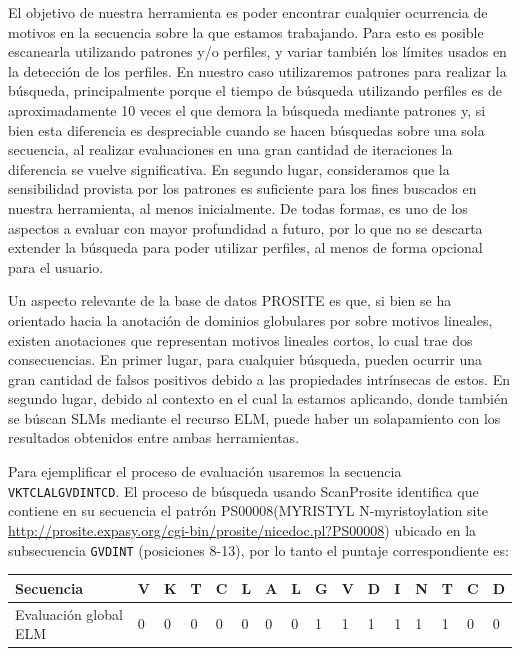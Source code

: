 El objetivo de nuestra herramienta es poder encontrar cualquier ocurrencia de motivos en la secuencia sobre la que estamos trabajando. 
Para esto es posible escanearla utilizando patrones y/o perfiles, y variar también los límites usados en la detección de los perfiles. 
En nuestro caso utilizaremos patrones para realizar la búsqueda, principalmente porque el tiempo de búsqueda utilizando perfiles es de aproximadamente 10 veces el que demora la búsqueda mediante patrones 
y, si bien esta diferencia es despreciable cuando se hacen búsquedas sobre una sola secuencia, al realizar evaluaciones en una gran cantidad de iteraciones la diferencia se vuelve significativa.
En segundo lugar, consideramos que la sensibilidad provista por los patrones es suficiente para los fines buscados en nuestra herramienta, al menos inicialmente.
De todas formas, es uno de los aspectos a evaluar con mayor profundidad a futuro, por lo que no se descarta extender la búsqueda para poder utilizar perfiles, al menos de forma opcional para el usuario. 

Un aspecto relevante de la base de datos PROSITE es que, si bien se ha orientado hacia la anotación de dominios globulares por sobre motivos lineales, existen anotaciones que representan motivos lineales cortos, 
lo cual trae dos consecuencias. En primer lugar, para cualquier búsqueda, pueden ocurrir una gran cantidad de falsos positivos debido a las propiedades intrínsecas de estos.
En segundo lugar, debido al contexto en el cual la estamos aplicando, donde también se búscan SLMs mediante el recurso ELM, puede haber un solapamiento con los resultados obtenidos entre ambas herramientas.

Para ejemplificar el proceso de evaluación usaremos la secuencia \texttt{VKTCLALGVDINTCD}. El proceso de búsqueda usando ScanProsite identifica que contiene en su secuencia el patrón PS00008(MYRISTYL N-myristoylation site 
\url{http://prosite.expasy.org/cgi-bin/prosite/nicedoc.pl?PS00008}) ubicado en la subsecuencia \texttt{GVDINT} (posiciones 8-13), por lo tanto el puntaje correspondiente es:

\vspace{0.5cm}
\begin{tabular}{llllllllllllllll} 
\hline
Secuencia & \textbf{V} & \textbf{K} & \textbf{T} & \textbf{C} & \textbf{L} & \textbf{A} & \textbf{L} & \textbf{G} & \textbf{V} & \textbf{D} & \textbf{I} & \textbf{N} & \textbf{T} & \textbf{C} & \textbf{D}\\ \hline
Evaluación global ELM & 0 & 0 & 0 & 0 & 0 & 0 & 0 & 1 & 1 & 1 & 1 & 1 & 1 & 0 & 0 \\ \hline
\end{tabular}













